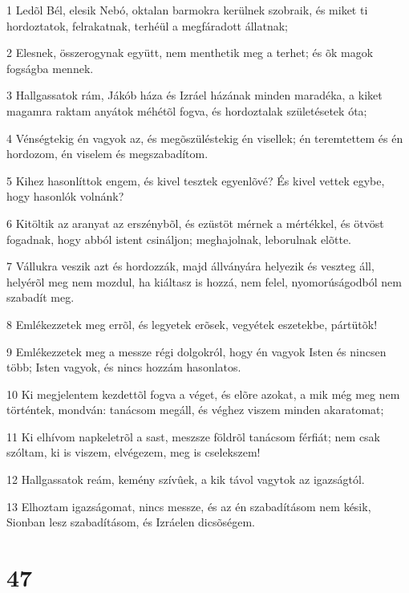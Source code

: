 \par 1 Ledõl Bél, elesik Nebó, oktalan barmokra kerülnek szobraik, és miket ti hordoztatok, felrakatnak, terhéül a megfáradott állatnak;
\par 2 Elesnek, összerogynak együtt, nem menthetik meg a terhet; és õk magok fogságba mennek.
\par 3 Hallgassatok rám, Jákób háza és Izráel házának minden maradéka, a kiket magamra raktam anyátok méhétõl fogva, és hordoztalak születésetek óta;
\par 4 Vénségtekig én vagyok az, és megõszüléstekig én visellek; én teremtettem és én hordozom, én viselem és megszabadítom.
\par 5 Kihez hasonlíttok engem, és kivel tesztek egyenlõvé? És kivel vettek egybe, hogy hasonlók volnánk?
\par 6 Kitöltik az aranyat az erszénybõl, és ezüstöt mérnek a mértékkel, és ötvöst fogadnak, hogy abból istent csináljon; meghajolnak, leborulnak elõtte.
\par 7 Vállukra veszik azt és hordozzák, majd állványára helyezik és veszteg áll, helyérõl meg nem mozdul, ha kiáltasz is hozzá, nem felel, nyomorúságodból nem szabadít meg.
\par 8 Emlékezzetek meg errõl, és legyetek erõsek, vegyétek eszetekbe, pártütõk!
\par 9 Emlékezzetek meg a messze régi dolgokról, hogy én vagyok Isten és nincsen több; Isten vagyok, és nincs hozzám hasonlatos.
\par 10 Ki megjelentem kezdettõl fogva a véget, és elõre azokat, a mik még meg nem történtek, mondván: tanácsom megáll, és véghez viszem minden akaratomat;
\par 11 Ki elhívom napkeletrõl a sast, meszsze földrõl tanácsom férfiát; nem csak szóltam, ki is viszem, elvégezem, meg is cselekszem!
\par 12 Hallgassatok reám, kemény szívûek, a kik távol vagytok az igazságtól.
\par 13 Elhoztam igazságomat, nincs messze, és az én szabadításom nem késik, Sionban lesz szabadításom, és Izráelen dicsõségem.

\chapter{47}

